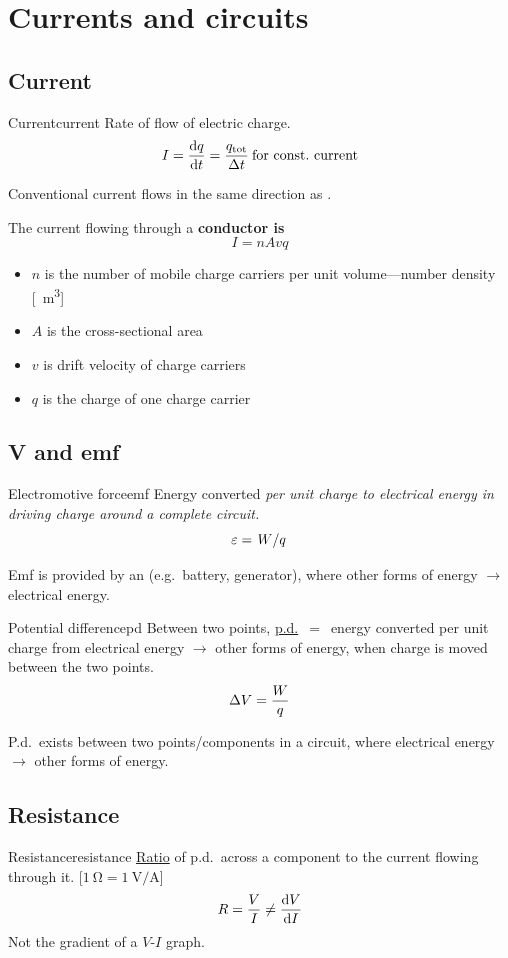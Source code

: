 \chapter{Currents and circuits}
\section{Current}
\begin{definition}{Current}{current}
	Rate of flow of electric charge.
	\[I = \odv{q}{t} = \f{q_\text{tot}}{\Delta t}\:\text{for const.~current}\]
\end{definition}
Conventional current flows in the same direction as .

The current flowing through a \bf{conductor} is
\[I = nAvq\]
\begin{itemize}
	\item \(n\) is the number of mobile charge carriers per unit volume---number density [\unit{\per\cubic\metre}]
	\item \(A\) is the cross-sectional area
	\item \(v\) is drift velocity of charge carriers
	\item \(q\) is the charge of one charge carrier
\end{itemize}

\section{V and emf}
\begin{definition}{Electromotive force}{emf}
	Energy converted \it{per unit charge} to electrical energy
	in driving charge around a complete circuit.
	\[\epsilon = \lf{W}{q}\]
\end{definition}
Emf is provided by an  (e.g.~battery, generator),
where other forms of energy \(\to\) electrical energy.

\begin{definition}{Potential difference}{pd}
	Between two points, \underline{p.d.}~\(=\)~energy converted per unit
	charge from electrical energy \(\to\) other forms of energy,
	when charge is moved between the two points.
	\[\Delta V = \frac{W}{q}\]
\end{definition}
P.d.~exists between two points/components in a circuit, where
electrical energy \(\to\) other forms of energy.

\section{Resistance}
\begin{definition}{Resistance}{resistance}
	\underline{Ratio} of p.d.~across a component to the current flowing through it. [\(\qty{1}{\ohm}=\qty{1}{\volt\per\ampere}\)]
	\[R = \f{V}{I} \neq \odv{V}{I}\]
	Not the gradient of a \(V\)-\(I\) graph.
\end{definition}

